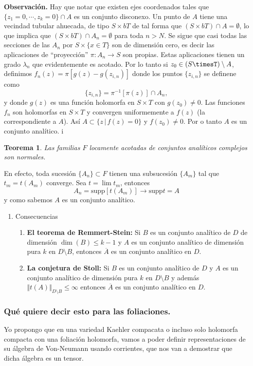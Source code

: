 \documentclass[letterpaper]{article}
\newtheorem{teorema}{Teorema}[section]
\newcommand{\obs}{{\newline \noindent \sc \textbf{Observación. }}}
\begin{document}
\obs Hay que notar que existen ejes coordenados tales que \(\{z_1=0,\cdots,z_k=0\}\cap A\) es un conjunto disconexo. Un punto de \(A\) tiene una vecindad tubular ahuecada, de tipo \(S\times bT\) de tal forma que \((S\times bT)\cap A=\emptyset\), lo que implica que \((S\times bT)\cap A_n=\emptyset\) para toda \(n>N\). Se sigue que casi todas las secciones de las \(A_n\) por \(S\times\{x\in T\}\) son de dimensión cero, es decir las aplicaciones de ``proyección'' \(\pi:A_n\rightarrow S\) son propias. Estas aplicaciones tienen un grado \(\lambda_n\) que evidentemente es acotado. Por lo tanto si \(z_0\in(S\timesT)\setminus A\), definimos \(f_n(z)=\pi[g(z)-g(z_{i,n})]\) donde los puntos \(\{z_{i,n}\}\) se definene como
\[
\{z_{i,n}\}=\pi^{-1}[\pi(z)]\cap A_n,
\]
y donde \(g(z)\) es una función holomorfa en \(S\times T\) con \(g(z_0)\neq0\). Las funciones \(f_n\) son holomorfas en \(S\times T\) y convergen uniformemente a \(f(z)\) (la correspondiente a \(A\)). Así \(A\subset\{z\,|\,f(z)=0\}\) y \(f(z_0)\neq0\). Por o tanto \(A\) es un conjunto analítico.
i\begin{teorema}
Las familias \(F\) locamente acotadas de conjuntos analíticos complejos son normales.
\end{teorema}
En efecto, toda sucesión \(\{A_n\}\subset F\) tienen una subsucesión \(\{A_m\}\) tal que \(t_m=t(A_m)\) converge. Sea \(t=\lim t_m\), entonces
\[
    A_n=\mathrm{supp}[t(A_m)]\rightarrow\mathrm{supp}t=A
\]
y como sabemos \(A\) es un conjunto analítico.
\begin{enumerate}
\item Consecuencias
\label{sec:org6dba31e}
\begin{enumerate}
\item \textbf{El teorema de Remmert-Stein:} Si \(B\) es un conjunto analítico de \(D\) de dimensión \(\dim(B)\leq k-1\) y \(A\) es un conjunto analítico de dimensión pura \(k\) en \(D\setminus B\), entonces \(\overline{A}\) es un conjunto analítico en \(D\).
\item \textbf{La conjetura de Stoll:} Si \(B\) es un conjunto analítico de \(D\) y \(A\) es un conjunto analítico de dimensión pura \(k\) en \(D\setminus B\) y además \(\Vert t(A)\Vert_{D\setminus B}\leq\infty\) entonces \(\overline{A}\) es un conjunto analítico en \(D\).
\end{enumerate}
\end{enumerate}
\subsubsection{Qué quiere decir esto para las foliaciones.}
\label{sec:orgecf9c22}
\noindent Yo propongo que en una variedad Kaehler compacata o incluso solo holomorfa compacta con una foliación holomorfa, vamos a poder definir representaciones de su álgebra de Von-Neumann usando corrientes, que nos van a demostrar que dicha álgebra es un tensor.
\end{document}
